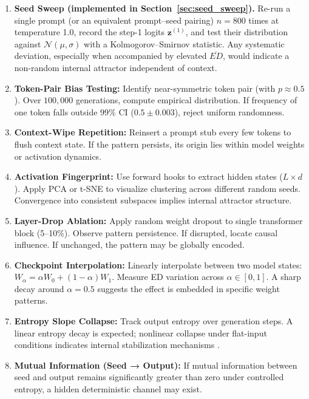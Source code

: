 \documentclass[12pt]{article}
\begin{document}
\begin{enumerate}[label=BP\arabic*, leftmargin=*]
\item \textbf{Seed Sweep (implemented in Section~\ref{sec:seed_sweep}).}
      Re-run a single prompt (or an equivalent prompt–seed pairing)
      $n=800$ times at temperature 1.0, record the step-1
      logits $\mathbf z^{(1)}$, and test their distribution against
      $\mathcal N(\mu,\sigma)$ with a Kolmogorov–Smirnov statistic.
      Any systematic deviation, especially when accompanied by
      elevated $\overline{ED}$, would indicate a non-random internal
      attractor independent of context\citep{geva2022lm}.

    \item \textbf{Token-Pair Bias Testing:} Identify near-symmetric token pair (with $p \approx 0.5$). Over $100,000$ generations, compute empirical distribution. If frequency of one token falls outside 99\% CI ($0.5 \pm 0.003$), reject uniform randomness.

    \item \textbf{Context-Wipe Repetition:} Reinsert a prompt stub every few tokens to flush context state. If the pattern persists, its origin lies within model weights or activation dynamics.

    \item \textbf{Activation Fingerprint:} Use forward hooks to extract hidden states ($L \times d$). Apply PCA or t-SNE to visualize clustering across different random seeds. Convergence into consistent subspaces implies internal attractor structure\citep{mu2023embeddings}.

    \item \textbf{Layer-Drop Ablation:} Apply random weight dropout to single transformer block (5--10\%). Observe pattern persistence. If disrupted, locate causal influence. If unchanged, the pattern may be globally encoded.

    \item \textbf{Checkpoint Interpolation:} Linearly interpolate between two model states: $W_\alpha = \alpha W_0 + (1-\alpha)W_1$. Measure ED variation across $\alpha \in [0, 1]$. A sharp decay around $\alpha=0.5$ suggests the effect is embedded in specific weight patterns.

    \item \textbf{Entropy Slope Collapse:} Track output entropy over generation steps. A linear entropy decay is expected; nonlinear collapse under flat-input conditions indicates internal stabilization mechanisms \citep{ganguli2022predictability}.

    \item \textbf{Mutual Information (Seed → Output):} If mutual information between seed and output remains significantly greater than zero under controlled entropy, a hidden deterministic channel may exist\citep{mu2023embeddings}.
\end{enumerate}
\end{document}
